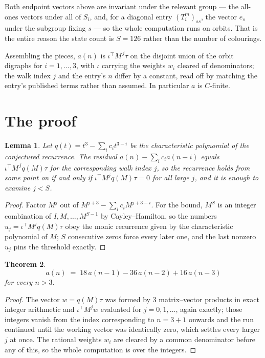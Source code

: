 \documentclass[11pt,a4paper]{article}
\theoremstyle{plain}
\newtheorem{theorem}{Theorem}
\newtheorem{lemma}[theorem]{Lemma}
\theoremstyle{definition}
\begin{document}
Both endpoint vectors above are invariant under the relevant group --- the all-ones vectors
under all of $S_i$, and, for a diagonal entry $(T_i^m)_{ss}$, the vector $e_s$ under the
subgroup fixing $s$ --- so the whole computation runs on orbits. That is the entire reason the
state count is $S=126$ rather than the number of colourings.

Assembling the pieces, $a(n)$ is $\iota^{\!\top}M^{\,j}\tau$ on the disjoint union of the
orbit digraphs for $i=1,\dots,3$, with $\iota$ carrying the weights $w_i$ cleared of
denominators; the walk index $j$ and the entry's $n$ differ by a constant, read off by
matching the entry's published terms rather than assumed. In particular $a$ is $C$-finite.

\section{The proof}

\begin{lemma}\label{lem:crit}
Let $q(t)=t^{3}-\sum_i c_it^{3-i}$ be the characteristic polynomial of the
conjectured recurrence. The residual $a(n)-\sum_ic_ia(n-i)$ equals
$\iota^{\!\top}M^{\,j}q(M)\tau$ for the corresponding walk index $j$, so the recurrence
holds from some point on if and only if $\iota^{\!\top}M^{j}q(M)\tau=0$ for all large $j$,
and it is enough to examine $j<S$.
\end{lemma}

\begin{proof}
Factor $M^{j}$ out of $M^{j+3}-\sum_ic_iM^{j+3-i}$. For the bound, $M^{S}$
is an integer combination of $I,M,\dots,M^{S-1}$ by Cayley--Hamilton, so the numbers
$u_j=\iota^{\!\top}M^{j}q(M)\tau$ obey the monic recurrence given by the characteristic
polynomial of $M$; $S$ consecutive zeros force every later one, and the last nonzero $u_j$
pins the threshold exactly.
\end{proof}

\begin{theorem}
\[
a(n)\;=\;18\,a(n-1) - 36\,a(n-2) + 16\,a(n-3)
\]
for every $n>3$.
\end{theorem}

\begin{proof}
The vector $w=q(M)\tau$ was formed by $3$ matrix--vector products in exact integer
arithmetic and $\iota^{\!\top}M^{j}w$ evaluated for $j=0,1,\dots$, again exactly; those
integers vanish from the index corresponding to $n=3+1$ onwards and the run continued
until the working vector was identically zero, which settles every larger $j$ at once. The
rational weights $w_i$ are cleared by a common denominator before any of this, so the whole
computation is over the integers.
\end{proof}
\end{document}
